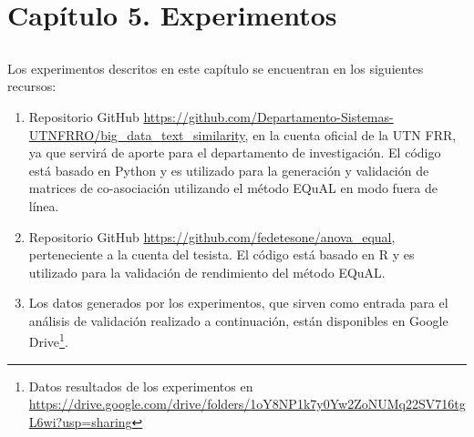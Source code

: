 \chapter*{Capítulo 5. \textbf{Experimentos}}\label{ch:experimentos}

\section*{}
\addtocounter{section}{1}
\setcounter{subsection}{0}

Los experimentos descritos en este capítulo se encuentran en los siguientes recursos:
\begin{enumerate}
	\item Repositorio GitHub \url{https://github.com/Departamento-Sistemas-UTNFRRO/big_data_text_similarity}, en la cuenta oficial de la UTN FRR, ya que servirá de aporte para el departamento de investigación. El código está basado en Python y es utilizado para la generación y validación de matrices de co-asociación utilizando el método EQuAL en modo fuera de línea.
	\item Repositorio GitHub \url{https://github.com/fedetesone/anova_equal}, perteneciente a la cuenta del tesista. El código está basado en R y es utilizado para la validación de rendimiento del método EQuAL.
	\item Los datos generados por los experimentos, que sirven como entrada para el análisis de validación realizado a continuación, están disponibles en Google Drive\footnote{Datos resultados de los experimentos en \url{https://drive.google.com/drive/folders/1oY8NP1k7y0Yw2ZoNUMq22SV716tgL6wi?usp=sharing}}.
\end{enumerate}






